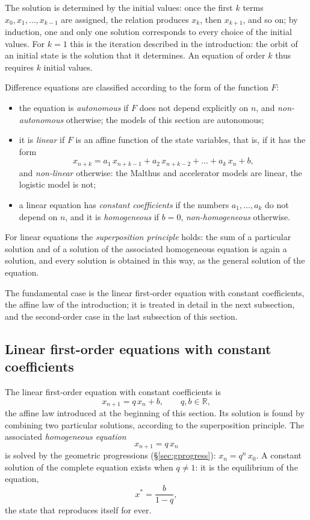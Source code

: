 \documentclass[11pt,a4paper]{article}
\theoremstyle{definition} \newtheorem{definition}{Definition} \theoremstyle{plain} \newtheorem{theorem}{Theorem}
\begin{document}
The solution is determined by the initial values: once the first $k$ terms
$x_0,x_1,\ldots,x_{k-1}$ are assigned, the relation produces $x_k$, then
$x_{k+1}$, and so on; by induction, one and only one solution corresponds
to every choice of the initial values. For $k=1$ this is the iteration
described in the introduction: the orbit of an initial state is the
solution that it determines. An equation of order $k$ thus requires $k$
initial values.

Difference equations are classified according to the form of the function
$F$:
\begin{itemize}
\item the equation is \emph{autonomous} if $F$ does not depend explicitly
on $n$, and \emph{non-autonomous} otherwise; the models of this section
are autonomous;
\item it is \emph{linear} if $F$ is an affine function of the state
variables, that is, if it has the form
\[ x_{n+k} = a_1\,x_{n+k-1} + a_2\,x_{n+k-2} + \ldots + a_k\,x_n + b, \]
and \emph{non-linear} otherwise: the Malthus and accelerator models are
linear, the logistic model is not;
\item a linear equation has \emph{constant coefficients} if the numbers
$a_1,\ldots,a_k$ do not depend on $n$, and it is \emph{homogeneous} if
$b=0$, \emph{non-homogeneous} otherwise.
\end{itemize}
For linear equations the \emph{superposition principle} holds: the sum of
a particular solution and of a solution of the associated homogeneous
equation is again a solution, and every solution is obtained in this way,
as the general solution of the equation.

The fundamental case is the linear first-order equation with constant
coefficients, the affine law of the introduction; it is treated in detail
in the next subsection, and the second-order case in the last subsection
of this section.

\subsection{Linear first-order equations with constant coefficients}

The linear first-order equation with constant coefficients is
\[ x_{n+1} = q\,x_n + b, \qquad q, b \in \mathbb{R}, \]
the affine law introduced at the beginning of this section. Its solution
is found by combining two particular solutions, according to the
superposition principle. The associated \emph{homogeneous equation}
\[ x_{n+1} = q\,x_n \]
is solved by the geometric progressions (\S\ref{sec:gprogress}): $x_n=q^n\,x_0$. A constant
solution of the complete equation exists when $q\neq 1$: it is the
equilibrium of the equation,
\[ x^* = \frac{b}{1-q}, \]
the state that reproduces itself for ever.
\end{document}
